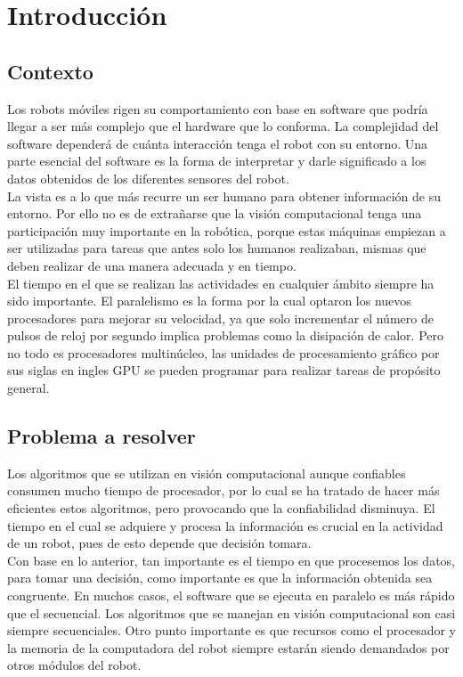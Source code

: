 \chapter{Introducción}
\section{Contexto}
Los robots móviles rigen su comportamiento con base en software que podría llegar a ser más complejo que el hardware que lo conforma. La complejidad del software dependerá  de cuánta interacción tenga el robot con su entorno. Una  parte esencial del software es la forma de interpretar y darle significado a los datos obtenidos de los diferentes sensores del robot. \\
La vista es a lo que más recurre un ser humano para obtener información de su entorno. Por ello no es de extrañarse que la visión computacional tenga una participación muy importante en la robótica, porque estas máquinas empiezan a ser utilizadas para tareas que antes solo los humanos realizaban, mismas que deben realizar de una manera adecuada y en tiempo.\\
El tiempo en el que se realizan las actividades en cualquier ámbito siempre ha sido importante. El paralelismo es la forma por la cual optaron los nuevos procesadores para mejorar su velocidad, ya que solo incrementar el número de pulsos de reloj por segundo implica problemas como la disipación de calor. Pero no todo es procesadores multinúcleo, las unidades de procesamiento gráfico por sus siglas en ingles GPU se pueden programar para realizar tareas de propósito general.\\

\section{Problema a resolver}
Los algoritmos que se utilizan en visión computacional aunque confiables consumen mucho tiempo de procesador, por lo cual se ha tratado de hacer más eficientes estos algoritmos, pero provocando que  la confiabilidad disminuya. El tiempo en el cual se adquiere y procesa la información es crucial en la actividad de un robot, pues de esto depende que decisión tomara.\\
Con base en lo anterior, tan importante es el tiempo en que procesemos los datos, para tomar una decisión, como importante es que la información obtenida sea congruente. En muchos casos, el software que se ejecuta en paralelo es más rápido que el secuencial. Los algoritmos que se manejan en visión computacional son  casi siempre secuenciales. Otro punto importante es que recursos como el procesador y la memoria de la computadora del robot siempre estarán siendo demandados por otros módulos del robot.\\

